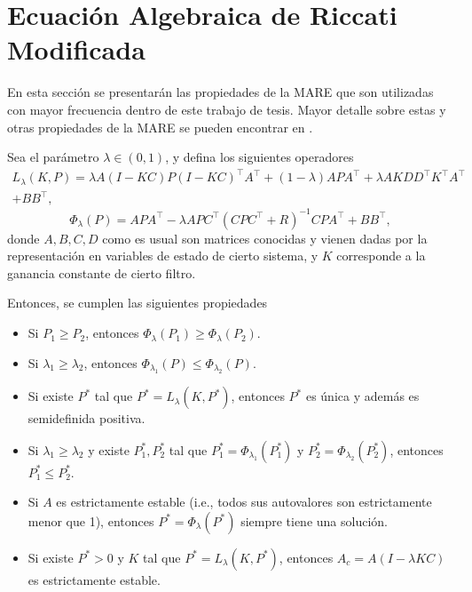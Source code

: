 \section{Ecuaci\'on Algebraica de Riccati Modificada}\label{sec:mare}
En esta secci\'on se presentar\'an las propiedades de la MARE que son utilizadas con mayor frecuencia dentro de este trabajo de tesis. Mayor detalle sobre estas y otras propiedades de la MARE se pueden encontrar en \cite{schenato2007optimal}.
\begin{lema}
Sea el par\'ametro $\lambda \in (0,1)$, y defina los siguientes operadores
\begin{multline}
L_{\lambda}(K,P) = \lambda A\left(I-KC\right)P\left(I-KC\right)^{\intercal}A^{\intercal}+(1-\lambda)APA^{\intercal}+\lambda AKDD^{\intercal}K^{\intercal}A^{\intercal}\\+BB^{\intercal},
\end{multline}
\begin{equation}
\Phi_{\lambda}(P) = APA^{\intercal}-\lambda APC^{\intercal}\left(CPC^{\intercal}+R\right)^{-1}CPA^{\intercal}+BB^{\intercal},
\end{equation}
donde $A,B,C,D$ como es usual son matrices conocidas y vienen dadas por la representaci\'on en variables de estado de cierto sistema, y $K$ corresponde a la ganancia constante de cierto filtro.

Entonces, se cumplen las siguientes propiedades
\begin{itemize}
\item Si $P_1\geq P_2$, entonces $\Phi_{\lambda}(P_1)\geq \Phi_{\lambda}(P_2)$.
\item Si $\lambda_1 \geq \lambda_2$, entonces $\Phi_{\lambda_1}(P)\leq \Phi_{\lambda_2}(P)$.
\item Si existe $P^*$ tal que $P^* = L_{\lambda}(K,P^*)$, entonces $P^*$ es \'unica y adem\'as es semidefinida positiva.
\item Si $\lambda_1\geq \lambda_2$ y existe $P_1^*,P_2^*$ tal que $P_1^*=\Phi_{\lambda_1}(P_1^*)$ y $P_2^*=\Phi_{\lambda_2}(P_2^*)$, entonces $P_1^*\leq P_2^*$.
\item Si $A$ es estrictamente estable (i.e., todos sus autovalores son estrictamente menor que 1), entonces $P^*=\Phi_{\lambda}(P^*)$ siempre tiene una soluci\'on.
\item Si existe $P^*>0$ y $K$ tal que $P^*=L_{\lambda}(K,P^*)$, entonces $A_c=A\left(I-\lambda KC\right)$ es estrictamente estable.
\end{itemize}
\end{lema}

